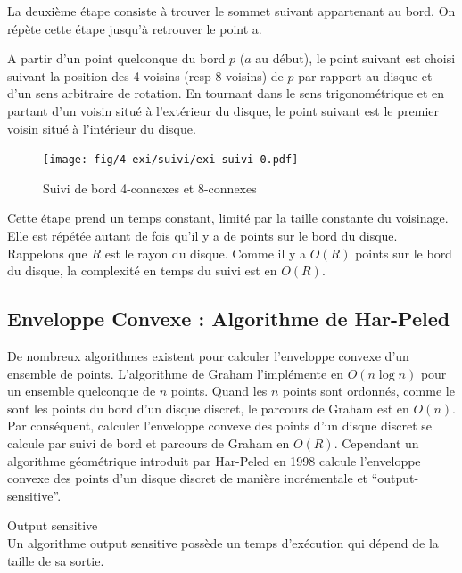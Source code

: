La deuxième étape consiste à trouver le sommet suivant appartenant au bord. On répète cette étape jusqu'à retrouver le point a.

A partir d'un point quelconque du bord $p$ ($a$ au début), le point suivant est choisi suivant la position des 4 voisins (resp 8 voisins) de $p$ par rapport au disque et d'un sens arbitraire de rotation. En tournant dans le sens trigonométrique et en partant d'un voisin situé à l'extérieur du disque, le point suivant est le premier voisin situé à l'intérieur du disque. 

\begin{figure}[H]
  \centering
  \texttt{[image: fig/4-exi/suivi/exi-suivi-0.pdf]}
  \caption{Suivi de bord 4-connexes et 8-connexes}
\end{figure}
  
Cette étape prend un temps constant, limité par la taille constante du voisinage. Elle est répétée autant de fois qu'il y a de points sur le bord du disque. Rappelons que $R$ est le rayon du disque. Comme il y a $O(R)$ points sur le bord du disque, la complexité en temps du suivi est en $O(R)$. 

\subsection{Enveloppe Convexe : Algorithme de Har-Peled}

De nombreux algorithmes existent pour calculer l'enveloppe convexe d'un ensemble de points. L'algorithme de Graham \cite{Graham1972} l'implémente en $O(n \log n)$ pour un ensemble quelconque de $n$ points. Quand les $n$ points sont ordonnés, comme le sont les points du bord d'un disque discret, le parcours de Graham est en $O(n)$. Par conséquent, calculer l'enveloppe convexe des points d'un disque discret se calcule par suivi de bord et parcours de Graham en $O(R)$. Cependant un algorithme géométrique introduit par Har-Peled en 1998 \cite{HarPeled98} calcule l'enveloppe convexe des points d'un disque discret de manière incrémentale et ``output-sensitive''.

\begin{Definition}{Output sensitive}\\
\label{def:os}
      Un algorithme output sensitive possède un temps d’exécution qui dépend de la taille de sa sortie.
\end{Definition}

